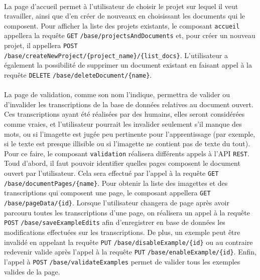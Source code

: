 \paragraph{}
La page d’accueil permet à l’utilisateur de choisir le projet sur lequel il veut travailler, ainsi que d'en créer de nouveaux en choisissant les documents qui le composent. Pour afficher la liste des projets existants, le composant \texttt{accueil} appellera la requête \texttt{GET} \texttt{/base/projectsAndDocuments} et, pour créer un nouveau projet, il appellera \texttt{POST} \texttt{/base/createNewProject/\{project\_name\}/\{list\_docs\}}. L'utilisateur a également la possibilité de supprimer un document existant en faisant appel à la requête \texttt{DELETE} \texttt{/base/deleteDocument/\{name\}}.


\paragraph{}
La page de validation, comme son nom l’indique, permettra de valider ou d’invalider les transcriptions de la base de données relatives au document ouvert. Ces transcriptions ayant été réalisées par des humains, elles seront considérées comme vraies, et l’utilisateur pourrait les invalider seulement s’il manque des mots, ou si l’imagette est jugée peu pertinente pour l’apprentissage (par exemple, si le texte est presque illisible ou si l’imagette ne contient pas de texte du tout).
\newline{}
Pour ce faire, le composant \texttt{validation} réalisera différents appels à l'API \texttt{REST}. Toud d'abord, il faut pouvoir identifier quelles pages composent le document ouvert par l'utilisateur. Cela sera effectué par l'appel à la requête \texttt{GET} \texttt{/base/documentPages/\{name\}}. Pour obtenir la liste des imagettes et des transcriptions qui composent une page, le composant appellera \texttt{GET} \texttt{/base/pageData/\{id\}}. Lorsque l'utilisateur changera de page après avoir parcouru toutes les transcriptions d'une page, on réalisera un appel à la requête \texttt{POST} \texttt{/base/saveExampleEdits} afin d'enregistrer en base de données les modifications effectuées sur les transcriptions. De plus, un exemple peut être invalidé en appelant la requête \texttt{PUT} \texttt{/base/disableExample/\{id\}} ou au contraire redevenir valide après l'appel à la requête \texttt{PUT} \texttt{/base/enableExample/\{id\}}. Enfin, l'appel à \texttt{POST} \texttt{/base/validateExamples} permet de valider tous les exemples valides de la page.

